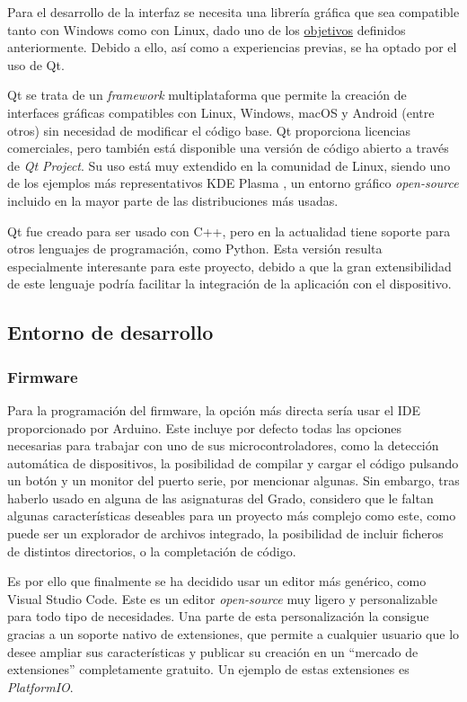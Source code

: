 Para el desarrollo de la interfaz se necesita una librería gráfica que sea compatible tanto con Windows como con Linux, dado uno de los \hyperref[sec:objetivos]{objetivos} definidos anteriormente. Debido a ello, así como a experiencias previas, se ha optado por el uso de Qt.

Qt se trata de un \textit{framework} multiplataforma que permite la creación de interfaces gráficas compatibles con Linux, Windows, macOS y Android (entre otros) sin necesidad de modificar el código base. Qt proporciona licencias comerciales, pero también está disponible una versión de código abierto a través de \textit{Qt Project}. Su uso está muy extendido en la comunidad de Linux, siendo uno de los ejemplos más representativos KDE Plasma \cite{kde-plasma}, un entorno gráfico \textit{open-source} incluido en la mayor parte de las distribuciones más usadas.

Qt fue creado para ser usado con C++, pero en la actualidad tiene soporte para otros lenguajes de programación, como Python. Esta versión resulta especialmente interesante para este proyecto, debido a que la gran extensibilidad de este lenguaje podría facilitar la integración de la aplicación con el dispositivo.

\subsection{Entorno de desarrollo}

\subsubsection{Firmware}

Para la programación del firmware, la opción más directa sería usar el IDE proporcionado por Arduino. Este incluye por defecto todas las opciones necesarias para trabajar con uno de sus microcontroladores, como la detección automática de dispositivos, la posibilidad de compilar y cargar el código pulsando un botón y un monitor del puerto serie, por mencionar algunas. Sin embargo, tras haberlo usado en alguna de las asignaturas del Grado, considero que le faltan algunas características deseables para un proyecto más complejo como este, como puede ser un explorador de archivos integrado, la posibilidad de incluir ficheros de distintos directorios, o la completación de código.

Es por ello que finalmente se ha decidido usar un editor más genérico, como Visual Studio Code. Este es un editor \textit{open-source} muy ligero y personalizable para todo tipo de necesidades. Una parte de esta personalización la consigue gracias a un soporte nativo de extensiones, que permite a cualquier usuario que lo desee ampliar sus características y publicar su creación en un ``mercado de extensiones'' completamente gratuito. Un ejemplo de estas extensiones es \textit{PlatformIO}.

